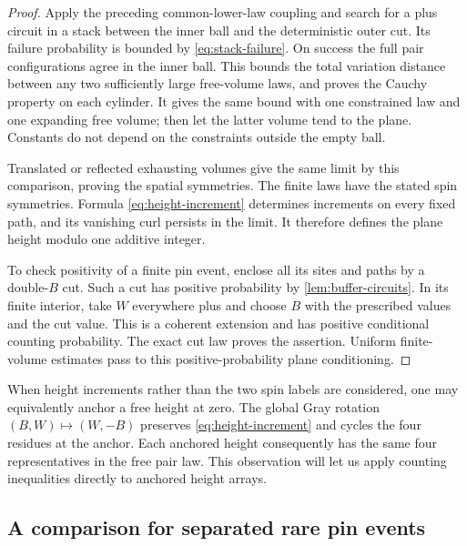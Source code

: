 \begin{proof}
Apply the preceding common-lower-law coupling and search for a plus circuit
in a stack between the inner ball and the deterministic outer cut.  Its
failure probability is bounded by \eqref{eq:stack-failure}.  On success
the full pair configurations agree in the inner ball.  This bounds the
total variation distance between any two sufficiently large free-volume
laws, and proves the Cauchy property on each cylinder.  It gives the same
bound with one constrained law and one expanding free volume; then let
the latter volume tend to the plane.  Constants do not depend on the
constraints outside the empty ball.

Translated or reflected exhausting volumes give the same limit by this
comparison, proving the spatial symmetries.  The finite laws have the
stated spin symmetries.  Formula \eqref{eq:height-increment} determines
increments on every fixed path, and its vanishing curl persists in the
limit.  It therefore defines the plane height modulo one additive
integer.

To check positivity of a finite pin event, enclose all its sites and paths
by a double-$B$ cut.  Such a cut has positive probability by
\cref{lem:buffer-circuits}.  In its finite interior, take $W$ everywhere
plus and choose $B$ with the prescribed values and the cut value.  This
is a coherent extension and has positive conditional counting probability.
The exact cut law proves the assertion.  Uniform finite-volume estimates
pass to this positive-probability plane conditioning.
\end{proof}

When height increments rather than the two spin labels are considered,
one may equivalently anchor a free height at zero.  The global Gray
rotation $(B,W)\mapsto(W,-B)$ preserves \eqref{eq:height-increment} and
cycles the four residues at the anchor.  Each anchored height consequently
has the same four representatives in the free pair law.  This observation
will let us apply counting inequalities directly to anchored height arrays.

\subsection{A comparison for separated rare pin events}

